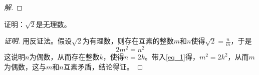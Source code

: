 \documentclass{book}[oneside]
\begin{document}
\begin{CJK*}{UTF8}{gbsn}
\begin{proof}[解]
  \end{proof}
  
  证明：$\sqrt{2}$是无理数。
\begin{proof}[证明]
  用反证法。假设$\sqrt{2}$为有理数，则存在互素的整数$m$和$n$使得$\sqrt{2}=\frac{n}{m}$，于是
  \begin{equation}\label{eq_1}
    2m^2=n^2
  \end{equation}
  这说明$n$为偶数，从而存在整数$k$，使得$n=2k$。带入\eqref{eq_1}得，$m^2=2k^2$，从而$m$为偶数，这与$m$和$n$互素矛盾，结论得证。
\end{proof}


      \chapter{}

\end{CJK*}
\end{document}
